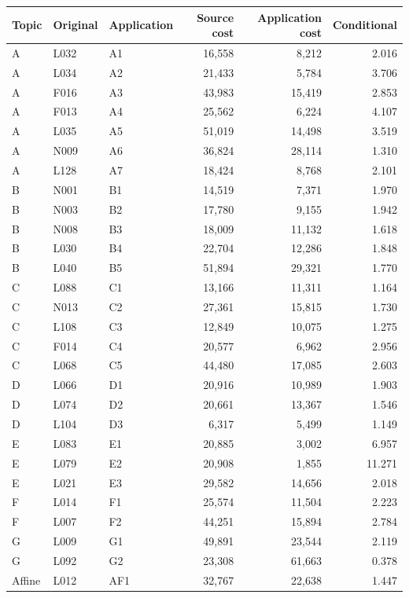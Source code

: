 \documentclass[11pt,a4paper]{article}
\begin{document}
\begin{center}\fontsize{8.5}{10.2}\selectfont\setlength{\tabcolsep}{5pt}
\renewcommand{\arraystretch}{1.10}\begin{tabular}{lllrrr}\toprule
Topic & Original & Application & Source cost & Application cost & Conditional\\\midrule
A & L032 & A1 & 16,558 & 8,212 & 2.016 \\
A & L034 & A2 & 21,433 & 5,784 & 3.706 \\
A & F016 & A3 & 43,983 & 15,419 & 2.853 \\
A & F013 & A4 & 25,562 & 6,224 & 4.107 \\
A & L035 & A5 & 51,019 & 14,498 & 3.519 \\
A & N009 & A6 & 36,824 & 28,114 & 1.310 \\
A & L128 & A7 & 18,424 & 8,768 & 2.101 \\
B & N001 & B1 & 14,519 & 7,371 & 1.970 \\
B & N003 & B2 & 17,780 & 9,155 & 1.942 \\
B & N008 & B3 & 18,009 & 11,132 & 1.618 \\
B & L030 & B4 & 22,704 & 12,286 & 1.848 \\
B & L040 & B5 & 51,894 & 29,321 & 1.770 \\
C & L088 & C1 & 13,166 & 11,311 & 1.164 \\
C & N013 & C2 & 27,361 & 15,815 & 1.730 \\
C & L108 & C3 & 12,849 & 10,075 & 1.275 \\
C & F014 & C4 & 20,577 & 6,962 & 2.956 \\
C & L068 & C5 & 44,480 & 17,085 & 2.603 \\
D & L066 & D1 & 20,916 & 10,989 & 1.903 \\
D & L074 & D2 & 20,661 & 13,367 & 1.546 \\
D & L104 & D3 & 6,317 & 5,499 & 1.149 \\
E & L083 & E1 & 20,885 & 3,002 & 6.957 \\
E & L079 & E2 & 20,908 & 1,855 & 11.271 \\
E & L021 & E3 & 29,582 & 14,656 & 2.018 \\
F & L014 & F1 & 25,574 & 11,504 & 2.223 \\
F & L007 & F2 & 44,251 & 15,894 & 2.784 \\
G & L009 & G1 & 49,891 & 23,544 & 2.119 \\
G & L092 & G2 & 23,308 & 61,663 & 0.378 \\
Affine & L012 & AF1 & 32,767 & 22,638 & 1.447 \\

\end{tabular}
\end{center}
\end{document}
